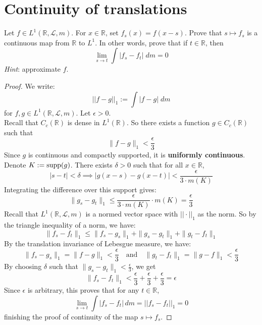 \documentclass[lang=cn,11pt]{elegantbook}
\begin{document}
  \section{Continuity of translations}
  Let $f\in L^1(\mathbb{R}, \mathcal{L}, m)$. For $x\in\mathbb{R}$, set $f_s(x)= f(x-s)$. 
  Prove that $s\mapsto f_s$ is a continuous map from $\mathbb{R}$ to $L^1$. In other words, prove that if $t\in\mathbb{R}$, then 
  \[
    \lim_{s\to t} \int |f_s-f_t| \; d m =0 
  \]
  \textit{Hint}: approximate $f$. 
\begin{proof}
We write: \[
||f-g||_1 := \int |f-g| \;dm
\] for $f,g\in L^1(\mathbb{R}, \mathcal{L}, m)$.
Let $\epsilon > 0$.\\
Recall that \( C_c(\mathbb{R}) \) is dense in \( L^1(\mathbb{R}) \). So there exists a function \( g \in C_c(\mathbb{R}) \) such that
\[
\| f - g \|_1 < \frac{\epsilon}{3}
\] Since \( g \) is continuous and compactly supported, it is \textbf{uniformly continuous}. Denote $ K :=\operatorname{supp} (g) $. 
There exists \(\delta > 0\) such that for all \( x \in \mathbb{R} \),
\[
|s - t| < \delta \implies |g(x - s) - g(x - t)| < \frac{\epsilon}{3 \cdot m(K)}
\]
Integrating the difference over this support gives:
\[
\| g_s - g_t \|_1 \leq \frac{\epsilon}{3 \cdot m(K)} \cdot m(K) = \frac{\epsilon}{3}
\]
Recall that $L^1(\mathbb{R}, \mathcal{L}, m)$ is a normed vector space with $||\cdot||_1$ as the norm. So by the triangle inequality of a norm, we have:
\[
\| f_s - f_t \|_1 \leq \| f_s - g_s \|_1 + \| g_s - g_t \|_1 + \| g_t - f_t \|_1\]
By the translation invariance of Lebesgue measure, we have: 
\[
\| f_s - g_s \|_1 = \| f - g \|_1 < \frac{\epsilon}{3} \quad \text{and} \quad \| g_t - f_t \|_1 = \| g - f \|_1 < \frac{\epsilon}{3}
\]By choosing \(\delta\) such that \(\| g_s - g_t \|_1 < \frac{\epsilon}{3}\), we get
\[
\| f_s - f_t \|_1 < \frac{\epsilon}{3} + \frac{\epsilon}{3} + \frac{\epsilon}{3} = \epsilon
\]
Since $\epsilon$ is arbitrary, this proves that for any \( t \in \mathbb{R} \), \[
\lim_{s \to t} \int |f_s - f_t| \, dm =  ||f_s - f_t||_1  = 0
\]finishing the proof of continuity of the map \( s \mapsto f_s \).
\end{proof}
\end{document}
